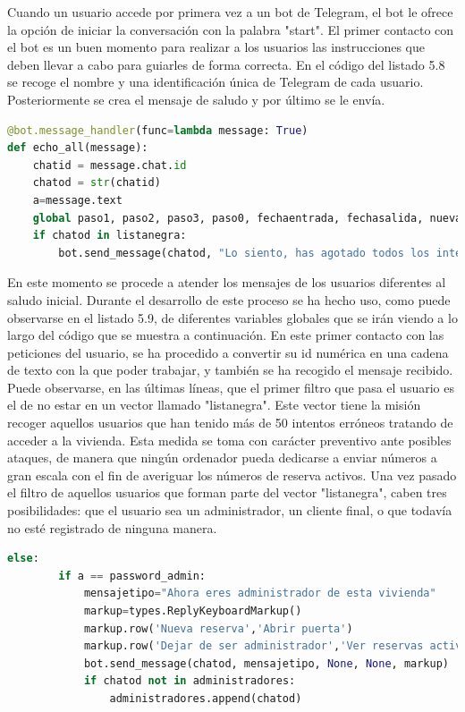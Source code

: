 Cuando un usuario accede por primera vez a un bot de Telegram, el bot le ofrece la opción de iniciar la conversación con la palabra "start". El primer contacto con el bot es un buen momento para realizar a los usuarios las instrucciones que deben llevar a cabo para guiarles de forma correcta. En el código del listado 5.8 se recoge el nombre  y una identificación única de Telegram de cada usuario. Posteriormente se crea el mensaje de saludo y por último se le envía.
\begin{lstlisting}[language=Python,
    caption={Recepción de mensajes por parte de los usuarios},
    label=src:recepcion-mensajes-usuarios
]
@bot.message_handler(func=lambda message: True)
def echo_all(message):
    chatid = message.chat.id
    chatod = str(chatid)
    a=message.text
    global paso1, paso2, paso3, paso0, fechaentrada, fechasalida, nuevapass, intentos, contador_intentos_erroneos, listanegra, fechainiciousuario, fechafinalusuario, numreserva
    if chatod in listanegra:
        bot.send_message(chatod, "Lo siento, has agotado todos los intentos posibles")
\end{lstlisting}
En este momento se procede a atender los mensajes de los usuarios diferentes al saludo inicial. Durante el desarrollo de este proceso se ha hecho uso, como puede observarse en el listado 5.9, de diferentes variables globales que se irán viendo a lo largo del código que se muestra a continuación.
En este primer contacto con las peticiones del usuario, se ha procedido a convertir su id numérica en una cadena de texto con la que poder trabajar, y también se ha recogido el mensaje recibido.
Puede observarse, en las últimas líneas, que el primer filtro que pasa el usuario es el de no estar en un vector llamado "listanegra". Este vector tiene la misión recoger aquellos usuarios que han tenido más de 50 intentos erróneos tratando de acceder a la vivienda. Esta medida se toma con carácter preventivo ante posibles ataques, de manera que ningún ordenador pueda dedicarse a enviar números a gran escala con el fin de averiguar los números de reserva activos.
Una vez pasado el filtro de aquellos usuarios que forman parte del vector "listanegra", caben tres posibilidades: que el usuario sea un administrador, un cliente final, o que todavía no esté registrado de ninguna manera.
\begin{lstlisting}[language=Python,
    caption={Panel de administrador},
    label=src:panel-de-administrador
]
    else:
        if a == password_admin:
            mensajetipo="Ahora eres administrador de esta vivienda"
            markup=types.ReplyKeyboardMarkup()
            markup.row('Nueva reserva','Abrir puerta')
            markup.row('Dejar de ser administrador','Ver reservas activas')
            bot.send_message(chatod, mensajetipo, None, None, markup)
            if chatod not in administradores:            
                administradores.append(chatod)
\end{lstlisting}
